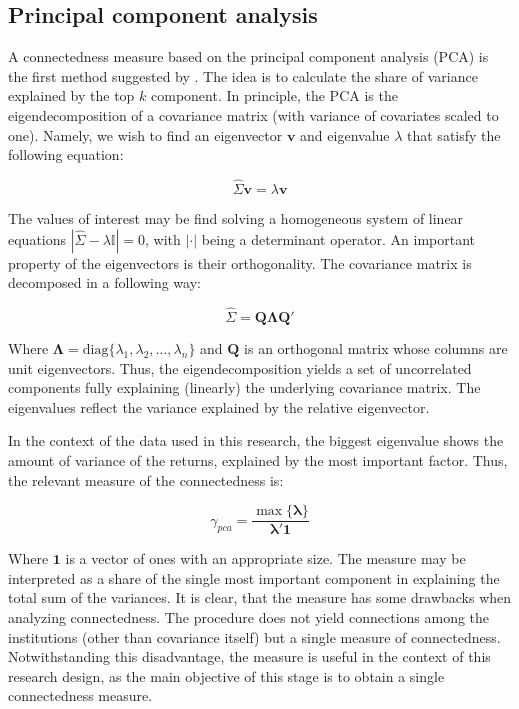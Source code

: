 \documentclass[12pt]{article}
\begin{document}
\subsection{Principal component analysis}\label{subsection:pca}

A connectedness measure based on the principal component analysis (PCA) is the first method suggested by \cite{billio12}. The idea is to calculate the share of variance explained by the top $k$ component. In principle, the PCA is the eigendecomposition of a covariance matrix (with variance of covariates scaled to one). Namely, we wish to find an eigenvector $\mathbf{v}$ and eigenvalue $\lambda$ that satisfy the following equation:

\begin{equation}
	\hat{\Sigma} \mathbf{v} = \lambda \mathbf{v}
\end{equation}

The values of interest may be find solving a homogeneous system of
linear equations $|\hat{\Sigma} - \lambda \mathbb{I}| = 0$, with $|\cdot|$ being a determinant operator. An important property of the eigenvectors is their orthogonality. The covariance matrix is decomposed in a following way:

\begin{equation}
	\hat{\Sigma} = \mathbf{Q}\mathbf{\Lambda}\mathbf{Q}'
\end{equation}

Where $\mathbf{\Lambda} = \text{diag} \{\lambda_1, \lambda_2, \dots, \lambda_n \}$ and $\mathbf{Q}$ is an orthogonal matrix whose columns are unit eigenvectors. Thus, the eigendecomposition yields a set of uncorrelated components fully explaining (linearly) the underlying covariance matrix. The eigenvalues reflect the variance explained by the relative eigenvector.

In the context of the data used in this research, the biggest eigenvalue shows the amount of variance of the returns, explained by the most important factor. Thus, the relevant measure of the connectedness is:

\begin{equation}
	\gamma_{pca} = \frac{\max \{\mathbf{\lambda}\}}{\mathbf{\lambda}'\mathbf{1}}
\end{equation}

Where $\mathbf{1}$ is a vector of ones with an appropriate size. The measure may be interpreted as a share of the single most important component in explaining the total sum of the variances. It is clear, that the measure has some drawbacks when analyzing connectedness. The procedure does not yield connections among the institutions (other than covariance itself) but a single measure of connectedness. Notwithstanding this disadvantage, the measure is useful in the context of this research design, as the main objective of this stage is to obtain a single connectedness measure. 
\end{document}
